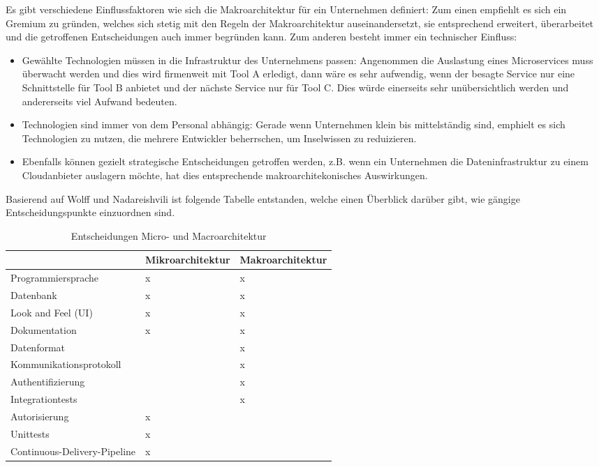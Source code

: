 Es gibt verschiedene Einflussfaktoren wie sich die Makroarchitektur für ein Unternehmen definiert: Zum einen empfiehlt es sich ein Gremium zu gründen, welches sich stetig mit den Regeln der Makroarchitektur auseinandersetzt, sie entsprechend erweitert, überarbeitet und die getroffenen Entscheidungen auch immer begründen kann.\cite{wolff2018mic_praxis} Zum anderen besteht immer ein technischer Einfluss\cite{wolff2018mic_praxis}:
\begin{itemize}
	\item Gewählte Technologien müssen in die Infrastruktur des Unternehmens passen: Angenommen die Auslastung eines Microservices muss überwacht werden und dies wird firmenweit mit Tool A erledigt, dann wäre es sehr aufwendig, wenn der besagte Service nur eine Schnittstelle für Tool B anbietet und der nächste Service nur für Tool C. Dies würde einerseits sehr unübersichtlich werden und andererseits viel Aufwand bedeuten. 
	\item Technologien sind immer von dem Personal abhängig: Gerade wenn Unternehmen klein bis mittelständig sind, emphielt es sich Technologien zu nutzen, die mehrere Entwickler beherrschen, um Inselwissen zu reduizieren. 
	\item Ebenfalls können gezielt strategische Entscheidungen getroffen werden, z.B. wenn ein Unternehmen die Dateninfrastruktur zu einem Cloudanbieter auslagern möchte, hat dies entsprechende makroarchitekonisches Auswirkungen.
\end{itemize}

Basierend auf Wolff und Nadareishvili ist folgende Tabelle entstanden, welche einen Überblick darüber gibt, wie gängige Entscheidungspunkte einzuordnen sind. \cite{wolff2018mic_praxis}\cite{irakli2016mic_arc}\cite{rewe2019mic_ppp}

\begin{table}
	\begin{center}
		\begin{tabular}{p{5cm}p{5cm}p{5cm}}
			& Mikroarchitektur & Makroarchitektur \\ \hline
			Programmiersprache &  x & x  \\
			Datenbank & x & x \\
			Look and Feel (UI) & x  & x  \\
			Dokumentation & x & x  \\
			Datenformat &   & x \\
			Kommunikationsprotokoll &   & x \\
			Authentifizierung &  & x \\
			Integrationtests &  &  x \\
			Autorisierung & x  &  \\
			Unittests & x  &  \\
			Continuous-Delivery-Pipeline & x &  \\
		\end{tabular}
	\end{center}
	\caption[Entscheidungen Micro- und Macroarchitektur]{Entscheidungen Micro- und Macroarchitektur}
\end{table}

